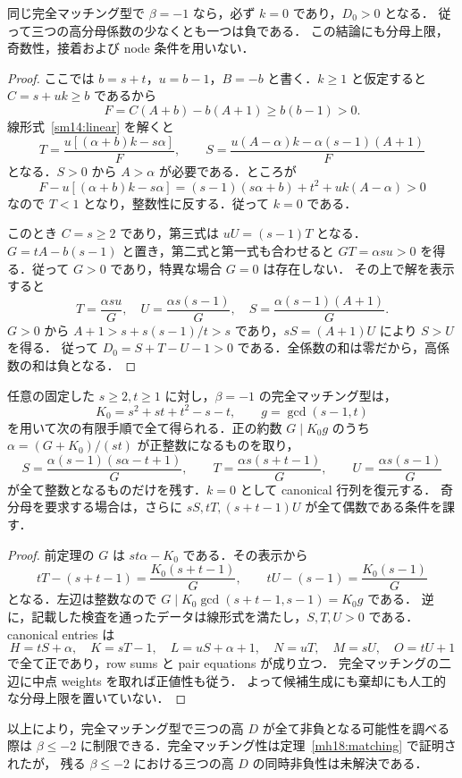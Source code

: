 \begin{theorem}[$\beta=-1$ の境界と高係数の負性]
\label{sm14:beta-boundary}
同じ完全マッチング型で $\beta=-1$ なら，必ず $k=0$ であり，$D_0>0$ となる．
従って三つの高分母係数の少なくとも一つは負である．
この結論にも分母上限，奇数性，接着および node 条件を用いない．
\end{theorem}

\begin{proof}
ここでは $b=s+t$，$u=b-1$，$B=-b$ と書く．$k\geq1$ と仮定すると
$C=s+uk\geq b$ であるから
\[
 F=C(A+b)-b(A+1)\geq b(b-1)>0.
\]
線形式~\eqref{sm14:linear} を解くと
\[
 T=\frac{u[(\alpha+b)k-s\alpha]}{F},\qquad
 S=\frac{u(A-\alpha)k-\alpha(s-1)(A+1)}{F}
\]
となる．$S>0$ から $A>\alpha$ が必要である．ところが
\[
 F-u[(\alpha+b)k-s\alpha]
 =(s-1)(s\alpha+b)+t^2+uk(A-\alpha)>0
\]
なので $T<1$ となり，整数性に反する．従って $k=0$ である．

このとき $C=s\geq2$ であり，第三式は $uU=(s-1)T$ となる．
$G=tA-b(s-1)$ と置き，第二式と第一式も合わせると
$GT=\alpha su>0$ を得る．従って $G>0$ であり，特異な場合 $G=0$ は存在しない．
その上で解を表示すると
\[
 T=\frac{\alpha su}{G},\quad
 U=\frac{\alpha s(s-1)}{G},\quad
 S=\frac{\alpha(s-1)(A+1)}{G}.
\]
$G>0$ から
$A+1>s+s(s-1)/t>s$ であり，$sS=(A+1)U$ により $S>U$ を得る．
従って $D_0=S+T-U-1>0$ である．全係数の和は零だから，高係数の和は負となる．
\end{proof}

\begin{corollary}[$\beta=-1$ の全整数模型を与える有限な約数手順]
\label{sm14:beta-boundary-factorization}
任意の固定した $s\geq2,t\geq1$ に対し，$\beta=-1$ の完全マッチング型は，
\[
 K_0=s^2+st+t^2-s-t,\qquad g=\gcd(s-1,t)
\]
を用いて次の有限手順で全て得られる．正の約数 $G\mid K_0g$ のうち
$\alpha=(G+K_0)/(st)$ が正整数になるものを取り，
\[
 S=\frac{\alpha(s-1)(s\alpha-t+1)}G,\qquad
 T=\frac{\alpha s(s+t-1)}G,\qquad
 U=\frac{\alpha s(s-1)}G
\]
が全て整数となるものだけを残す．$k=0$ として canonical 行列を復元する．
奇分母を要求する場合は，さらに $sS,tT,(s+t-1)U$ が全て偶数である条件を課す．
\end{corollary}

\begin{proof}
前定理の $G$ は $st\alpha-K_0$ である．その表示から
\[
 tT-(s+t-1)=\frac{K_0(s+t-1)}G,
 \qquad tU-(s-1)=\frac{K_0(s-1)}G
\]
となる．左辺は整数なので
$G\mid K_0\gcd(s+t-1,s-1)=K_0g$ である．
逆に，記載した検査を通ったデータは線形式を満たし，$S,T,U>0$ である．
canonical entries は
\[
 H=tS+\alpha,\quad K=sT-1,\quad
 L=uS+\alpha+1,\quad N=uT,\quad M=sU,\quad O=tU+1
\]
で全て正であり，row sums と pair equations が成り立つ．
完全マッチングの二辺に中点 weights を取れば正値性も従う．
よって候補生成にも棄却にも人工的な分母上限を置いていない．
\end{proof}

以上により，完全マッチング型で三つの高 $D$ が全て非負となる可能性を調べる際は
$\beta\leq-2$ に制限できる．完全マッチング性は定理~\ref{mh18:matching} で証明されたが，
残る $\beta\leq-2$ における三つの高 $D$ の同時非負性は未解決である．
